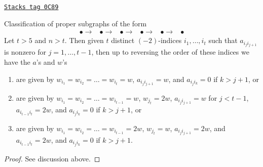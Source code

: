 \begin{lemma}[Long]
\label{models-lemma-long}
\href{https://stacks.math.columbia.edu/tag/0C89}{\texttt{Stacks tag 0C89}}

Classification of proper subgraphs of the form
$$
\begin{array}{cccccc}\bullet \longrightarrow & \bullet \longrightarrow & \bullet \longrightarrow & \bullet \longrightarrow & \bullet \longrightarrow & \bullet\end{array}
$$
Let $t > 5$ and $n > t$. Then given $t$ distinct $(-2)$-indices
$i_1, \ldots, i_t$ such that $a_{i_ji_{j + 1}}$ is nonzero for
$j = 1, \ldots, t - 1$, then up to reversing the order of these indices
we have the $a$'s and $w$'s
\begin{enumerate}
\item
\label{models-item-An}
are given by $w_{i_1} = w_{i_2} = \ldots = w_{i_t} = w$,
$a_{i_ji_{j + 1}} = w$, and $a_{i_ji_k} = 0$ if $k > j + 1$, or
\item
\label{models-item-Cn}
are given by $w_{i_1} = w_{i_2} = \ldots = w_{i_{t - 1}} = w$,
$w_{j_t} = 2w$, $a_{i_ji_{j + 1}} = w$ for $j < t - 1$,
$a_{i_{t - 1}i_t} = 2w$, and $a_{i_ji_k} = 0$ if $k > j + 1$, or
\item
\label{models-item-Bn}
are given by $w_{i_1} = w_{i_2} = \ldots = w_{i_{t - 1}} = 2w$,
$w_{j_t} = w$, $a_{i_ji_{j + 1}} = 2w$, and
$a_{i_{t - 1}i_t} = 2w$, and $a_{i_ji_k} = 0$ if $k > j + 1$.
\end{enumerate}
\end{lemma}

\begin{proof}
See discussion above.
\end{proof}

